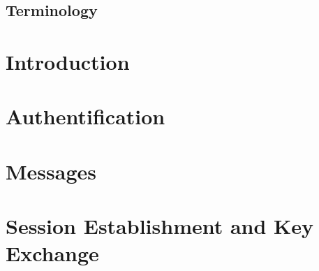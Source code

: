 \documentclass[11pt,a4paper]{scrreprt}
\title{\thetitle}
\author{v\theversion\\\theauthor}
\date{2025-10-24}
\begin{document}
\maketitle
\tableofcontents
\newpage

\section*{Terminology}



\chapter{Introduction}
\label{chap:intro}



\chapter{Authentification}


\chapter{Messages}


\chapter{Session Establishment and Key Exchange}





\printbibliography

\clearpage
\appendix

\begin{appendices}

\end{appendices}
\end{document}

